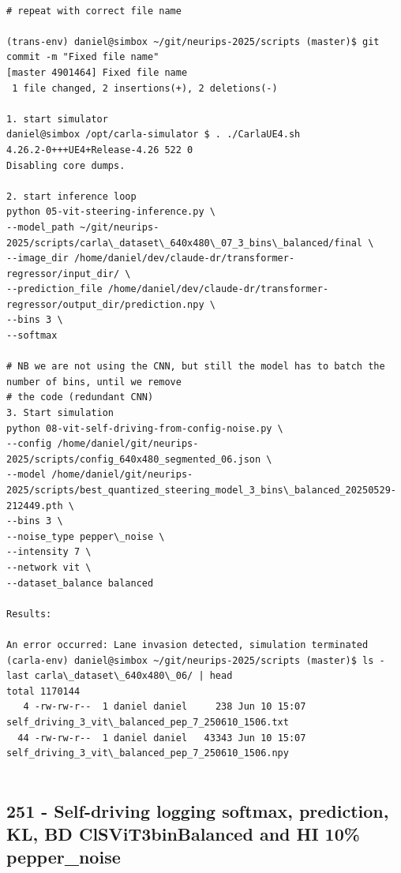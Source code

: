 \begin{verbatim}

# repeat with correct file name

(trans-env) daniel@simbox ~/git/neurips-2025/scripts (master)$ git commit -m "Fixed file name"
[master 4901464] Fixed file name
 1 file changed, 2 insertions(+), 2 deletions(-)
 
1. start simulator
daniel@simbox /opt/carla-simulator $ . ./CarlaUE4.sh 
4.26.2-0+++UE4+Release-4.26 522 0
Disabling core dumps.

2. start inference loop
python 05-vit-steering-inference.py \
--model_path ~/git/neurips-2025/scripts/carla\_dataset\_640x480\_07_3_bins\_balanced/final \
--image_dir /home/daniel/dev/claude-dr/transformer-regressor/input_dir/ \
--prediction_file /home/daniel/dev/claude-dr/transformer-regressor/output_dir/prediction.npy \
--bins 3 \
--softmax

# NB we are not using the CNN, but still the model has to batch the number of bins, until we remove
# the code (redundant CNN)
3. Start simulation
python 08-vit-self-driving-from-config-noise.py \
--config /home/daniel/git/neurips-2025/scripts/config_640x480_segmented_06.json \
--model /home/daniel/git/neurips-2025/scripts/best_quantized_steering_model_3_bins\_balanced_20250529-212449.pth \
--bins 3 \
--noise_type pepper\_noise \
--intensity 7 \
--network vit \
--dataset_balance balanced

Results:

An error occurred: Lane invasion detected, simulation terminated
(carla-env) daniel@simbox ~/git/neurips-2025/scripts (master)$ ls -last carla\_dataset\_640x480\_06/ | head
total 1170144
   4 -rw-rw-r--  1 daniel daniel     238 Jun 10 15:07 self_driving_3_vit\_balanced_pep_7_250610_1506.txt
  44 -rw-rw-r--  1 daniel daniel   43343 Jun 10 15:07 self_driving_3_vit\_balanced_pep_7_250610_1506.npy


\end{verbatim}

\subsection{251 - Self-driving logging softmax, prediction, KL, BD ClSViT3binBalanced and HI 10\% pepper\_noise}
\label{app_res:251}

